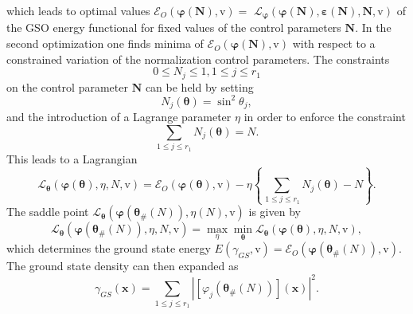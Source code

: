 \documentclass[aps,preprint]{revtex4}%
\begin{document}
which leads to optimal values $\mathcal{E}_{O}\left(  \mathbf{\varphi}\left(
\mathbf{N}\right)  \mathbf{,}\mathrm{v}\right)  =$ $\mathcal{L}%
_{\mathbf{\varphi}}\left(  \mathbf{\varphi}\left(  \mathbf{N}\right)
,\mathbf{\varepsilon}\left(  \mathbf{N}\right)  ,\mathbf{N,}\mathrm{v}\right)
$ of the GSO energy functional for fixed values of the control parameters
$\mathbf{N}$. In the second optimization one finds minima of $\mathcal{E}%
_{O}\left(  \mathbf{\varphi}\left(  \mathbf{N}\right)  \mathbf{,}%
\mathrm{v}\right)  $ with respect to a constrained variation of the
normalization control parameters. The constraints
\begin{equation}
0\leq N_{j}\leq1,1\leq j\leq r_{1}%
\end{equation}
on the control parameter $\mathbf{N}$ can be held by setting
\begin{equation}
N_{j}\left(  \mathbf{\theta}\right)  =\sin^{2}\theta_{j},
\end{equation}
and the introduction of a Lagrange parameter $\eta$ in order to enforce the
constraint
\begin{equation}
\sum_{1\leq j\leq r_{1}}N_{j}\left(  \mathbf{\theta}\right)  =N.
\end{equation}
This leads to a Lagrangian
\begin{equation}
\mathcal{L}_{\mathbf{\theta}}\left(  \mathbf{\varphi}\left(  \mathbf{\theta
}\right)  ,\eta,N,\mathrm{v}\right)  =\mathcal{E}_{O}\left(  \mathbf{\varphi
}\left(  \mathbf{\theta}\right)  \mathbf{,}\mathrm{v}\right)  -\eta\left\{
\sum_{\,1\leq j\leq r_{1}}N_{j}\left(  \mathbf{\theta}\right)  -N\right\}  .
\end{equation}
The saddle point $\mathcal{L}_{\mathbf{\theta}}\left(  \mathbf{\varphi}\left(
\mathbf{\theta}_{\#}\left(  N\right)  \right)  ,\eta\left(  N\right)
,\mathrm{v}\right)  $ is given by
\begin{equation}
\mathcal{L}_{\mathbf{\theta}}\left(  \mathbf{\varphi}\left(  \mathbf{\theta
}_{\#}\left(  N\right)  \right)  ,\eta,N,\mathrm{v}\right)  =\max_{\eta}%
\min_{\mathbf{\theta}}\mathcal{L}_{\mathbf{\theta}}\left(  \mathbf{\varphi
}\left(  \mathbf{\theta}\right)  ,\eta,N,\mathrm{v}\right)  ,
\end{equation}
which determines the ground state energy $E\left(  \gamma_{GS}\mathbf{,}%
\mathrm{v}\right)  =\mathcal{E}_{O}\left(  \mathbf{\varphi}\left(
\mathbf{\theta}_{\#}\left(  N\right)  \right)  ,\mathrm{v}\right)  .$The
ground state density can then expanded as
\begin{equation}
\gamma_{GS}\left(  \mathbf{x}\right)  =\sum_{1\leq j\leq r_{1}}\left\vert
\overset{}{\left[  \varphi_{j}\left(  \mathbf{\theta}_{\#}\left(  N\right)
\right)  \right]  \left(  \mathbf{x}\right)  }\right\vert ^{2}.
\end{equation}
\end{document}
